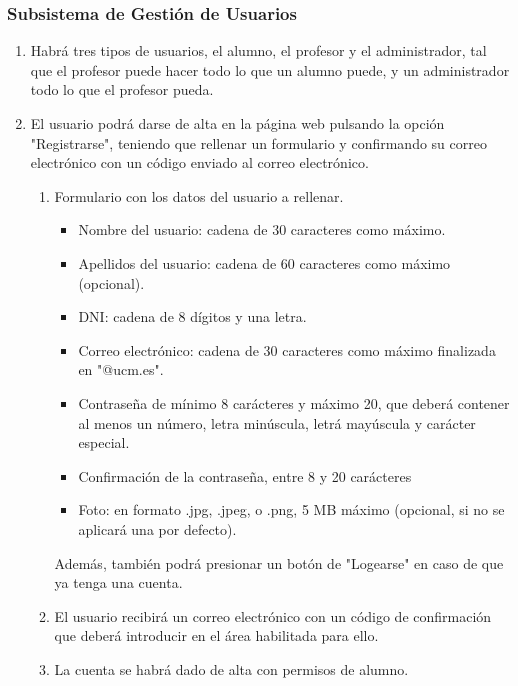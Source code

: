 \documentclass{article}
\begin{document}
        \subsubsection{Subsistema de Gestión de Usuarios}
        \begin{enumerate}[label=\textbf{SGU-RF(\arabic*)}, labelwidth=25mm, labelsep=2mm, itemindent=0mm, leftmargin=*, align=parleft] 
            \item Habrá tres tipos de usuarios, el alumno, el profesor y el administrador, tal que el profesor puede hacer todo lo que un alumno puede, y un administrador todo lo que el profesor pueda.
            
            \item El usuario podrá darse de alta en la página web pulsando la opción "Registrarse", teniendo que rellenar un formulario y confirmando su correo electrónico con un código enviado al correo electrónico.
            \begin{adjustwidth}{15mm}{0mm}
                \begin{enumerate}[label=\textbf{SGU-RF(2.\arabic*)}]
                    \item Formulario con los datos del usuario a rellenar.
                        \begin{itemize}
                            \item Nombre del usuario: cadena de 30 caracteres como máximo.
                            \item Apellidos del usuario: cadena de 60 caracteres como máximo (opcional).
                            \item DNI: cadena de 8 dígitos y una letra.
                            \item Correo electrónico: cadena de 30 caracteres como máximo finalizada en "@ucm.es".
                            \item Contraseña de mínimo 8 carácteres y máximo 20, que deberá contener al menos un número, letra minúscula, letrá mayúscula y carácter especial.
                            \item Confirmación de la contraseña, entre 8 y 20 carácteres
                            \item Foto: en formato .jpg, .jpeg, o .png, 5 MB máximo (opcional, si no se aplicará una por defecto).
                        \end{itemize}
                        Además, también podrá presionar un botón de "Logearse" en caso de que ya tenga una cuenta.
                    \item El usuario recibirá un correo electrónico con un código de confirmación que deberá introducir en el área habilitada para ello.
                    \item La cuenta se habrá dado de alta con permisos de alumno.
                \end{enumerate}
            \end{adjustwidth}
        

\end{enumerate}
\end{document}
